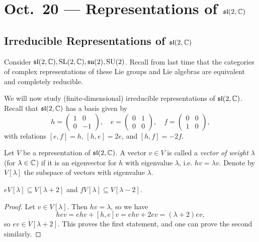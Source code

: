 \chapter{Oct.~20 --- Representations of \texorpdfstring{$\mathfrak{sl}(2, \mathbb{C})$}{sl(2, C)}}

\section{Irreducible Representations of \texorpdfstring{$\mathfrak{sl}(2, \mathbb{C})$}{sl(2, C)}}
\begin{remark}
  Consider $\mathfrak{sl}(2, \mathbb{C}), \operatorname{SL}(2, \mathbb{C}), \mathfrak{su}(2), \operatorname{SU}(2)$.
  Recall from last time that the categories
  of complex representations
  of these Lie groups and Lie algebras
  are equivalent and completely reducible.

  We will now study (finite-dimensional)
  irreducible representations of
  $\mathfrak{sl}(2, \mathbb{C})$. Recall that
  $\mathfrak{sl}(2, \mathbb{C})$ has a basis
  given by
  \[
    h = \begin{pmatrix}
      1 & 0 \\
      0 & -1
    \end{pmatrix}, \quad
    e = \begin{pmatrix}
      0 & 1 \\
      0 & 0
    \end{pmatrix}, \quad
    f = \begin{pmatrix}
      0 & 0 \\
      1 & 0
    \end{pmatrix},
  \]
  with relations
  $[e, f] = h$, $[h, e] = 2e$, and
  $[h, f] = -2f$.
\end{remark}

\begin{definition}
  Let $V$ be a representation of
  $\mathfrak{sl}(2, \mathbb{C})$. A vector
  $v \in V$ is called a
  \emph{vector of weight $\lambda$}
  (for $\lambda \in \mathbb{C}$) if it is an
  eigenvector for $h$ with eigenvalue
  $\lambda$, i.e. $hv = \lambda v$.
  Denote by $V[\lambda]$ the subspace of
  vectors with eigenvalue $\lambda$.
\end{definition}

\begin{lemma}\label{lem:weight-shift}
  $e V[\lambda] \subseteq V[\lambda + 2]$
  and $f V[\lambda] \subseteq V[\lambda - 2]$.
\end{lemma}

\begin{proof}
  Let $v \in V[\lambda]$. Then
  $hv = \lambda$, so we have
  \[
    hev = ehv + [h, e] v
    = ehv + 2e v
    = (\lambda + 2) ev,
  \]
  so $ev \in V[\lambda + 2]$. This
  proves the first statement, and
  one can prove the second similarly.
\end{proof}

